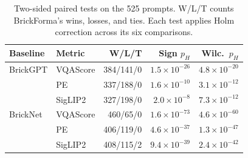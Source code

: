 \begin{table}[t]
\centering\small
\setlength{\tabcolsep}{3pt}
\begin{tabular}{llrrr}
\toprule
Baseline & Metric & W/L/T & Sign $p_H$ & Wilc.\ $p_H$ \\
\midrule
BrickGPT & VQAScore & 384/141/0 & $1.5\times 10^{-26}$ & $4.8\times 10^{-20}$ \\
 & PE & 337/188/0 & $1.6\times 10^{-10}$ & $3.1\times 10^{-12}$ \\
 & SigLIP2 & 327/198/0 & $2.0\times 10^{-8}$ & $7.3\times 10^{-12}$ \\
BrickNet & VQAScore & 460/65/0 & $1.6\times 10^{-73}$ & $4.6\times 10^{-60}$ \\
 & PE & 406/119/0 & $4.6\times 10^{-37}$ & $1.3\times 10^{-47}$ \\
 & SigLIP2 & 408/115/2 & $9.4\times 10^{-39}$ & $2.4\times 10^{-42}$ \\
\bottomrule
\end{tabular}
\caption{Two-sided paired tests on the 525 prompts. W/L/T counts BrickForma's wins, losses, and ties. Each test applies Holm correction across its six comparisons.}
\label{tab:sig}
\end{table}
